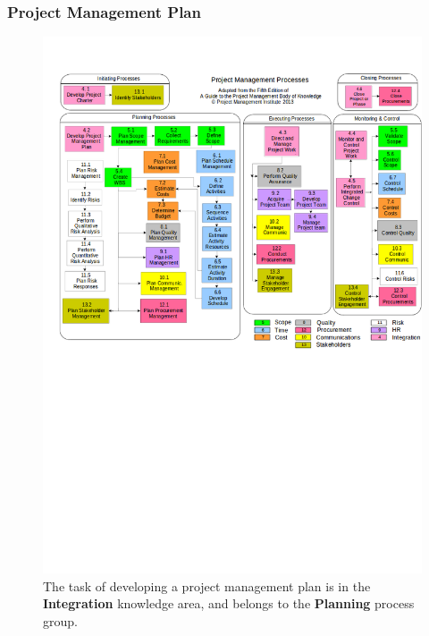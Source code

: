 \documentclass[aspectratio=169]{beamer}
\begin{document}
\begin{frame}
\frametitle{Project Management Plan}
\vspace{-0.5cm}
\begin{figure}
\caption{The task of developing a project management plan is in the \textbf{Integration} knowledge area, and belongs to the \textbf{Planning} process group.}
\vspace{-0.8cm}
\includegraphics[scale=0.3]{mapping}
\end{figure}
\end{frame}
\end{document}
